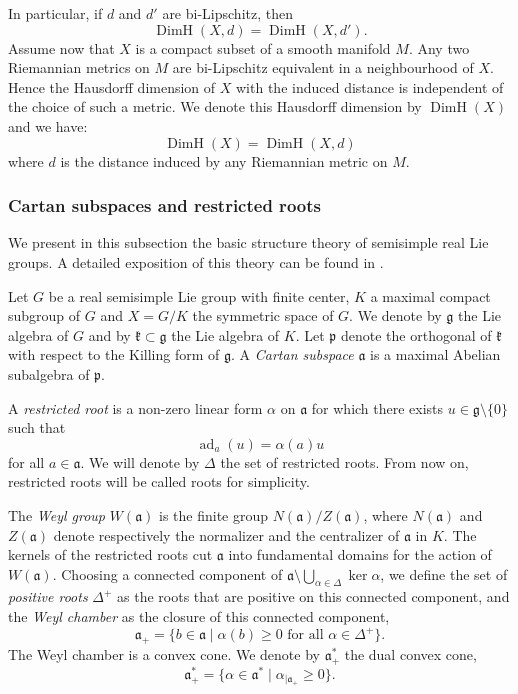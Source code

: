 \documentclass[JEP,XML,SOM,Unicode,NoEqCountersInSection,NoFloatCountersInSection,published]{cedram}
\theoremstyle{definition}
\newcommand{\fa}{\mathfrak{a}}
\newcommand{\frakg}{\mathfrak{g}}
\newcommand{\fp}{\mathfrak{p}}
\newcommand{\fk}{\mathfrak{k}}
\DeclareMathOperator{\DimH}{DimH}
\DeclareMathOperator{\ad}{ad}
\begin{document}
In particular, if $d$ and $d'$ are bi-Lipschitz, then \[\DimH(X,d) = \DimH(X,d').\]
Assume now that $X$ is a compact subset of a smooth manifold $M$. Any two Riemannian metrics on $M$ are bi-Lipschitz equivalent in a neighbourhood of $X$. Hence the Hausdorff dimension of $X$ with the induced distance is independent of the choice of such a metric. We denote this Hausdorff dimension by $\DimH(X)$ and we have:
\[\DimH(X)= \DimH(X,d)\]
where $d$ is the distance induced by any Riemannian metric on $M$.

 \label{subsec - lie theory}

\subsubsection{Cartan subspaces and restricted roots}
We present in this subsection the basic structure theory of semisimple real Lie groups. A detailed exposition of this theory can be found in \cite{eberlein1996geometry}.

Let $G$ be a real semisimple Lie group with finite center, $K$ a maximal compact subgroup of $G$ and $X=G/K$ the symmetric space of $G$. We denote by $\frakg$ the Lie algebra of $G$ and by $\fk\subset \frakg$ the Lie algebra of $K$. Let $\fp$ denote the orthogonal of $\fk$ with respect to the Killing form of $\frakg$. A \emph{Cartan subspace} $\fa$ is a maximal Abelian subalgebra of $\fp$.

A \emph{restricted root} is a non-zero linear form $\alpha$ on $\fa$ for which there exists $u\in \frakg \setminus \{0\}$ such that
\[\ad_a(u) = \alpha(a) u\]
for all $a\in \fa$. We will denote by $\Delta$ the set of restricted roots. From now on, restricted roots will be called roots for simplicity.

The \emph{Weyl group} $W(\fa)$ is the finite group $N(\fa)/Z(\fa)$, where $N(\fa)$ and $Z(\fa)$ denote respectively the normalizer and the centralizer of $\fa$ in $K$. The kernels of the restricted roots cut $\fa$ into fundamental domains for the action of $W(\fa)$. Choosing a connected component of $\fa \setminus \bigcup_{\alpha \in \Delta} \ker \alpha$, we define the set of \emph{positive roots} $\Delta^+$ as the roots that are positive on this connected component, and the \emph{Weyl chamber} as the closure of this connected component, \ie
\[\fa_+ = \{b\in \fa \mid \alpha(b) \geq 0 \textrm{ for all $\alpha\in \Delta^+$}\}.\]
The Weyl chamber is a convex cone. We denote by $\fa_+^*$ the dual convex cone, \ie
\[\fa_+^* = \{\alpha \in \fa^* \mid \alpha_{\vert \fa_+} \geq 0\}.\]
\end{document}
